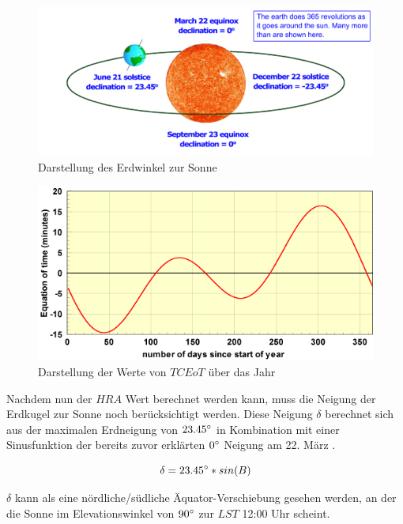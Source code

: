 \begin{figure}[htpb] %
    \centering
    \includegraphics[width=\textwidth,keepaspectratio=true]{pics/DeclinationAngleEarthSun.png}
    \caption{Darstellung des Erdwinkel zur Sonne \autocite{front:DeclinationAngle}}
    \label{fig:DeclinationAngleFigure}
\end{figure}

\begin{figure}[htpb] %
    \centering
    \includegraphics[width=\textwidth,keepaspectratio=true]{pics/TCEoT.png}
    \caption{Darstellung der Werte von $TCEoT$ über das Jahr \autocite{front:SolarTime}}
    \label{fig:TCEoT}
\end{figure}

Nachdem nun der $HRA$ Wert berechnet werden kann, muss die Neigung der Erdkugel zur Sonne noch berücksichtigt werden. Diese Neigung $\delta$ berechnet sich aus der maximalen Erdneigung von $23.45\degree$ in Kombination mit einer Sinusfunktion der bereits zuvor erklärten $0\degree$ Neigung am 22. März \autocite{front:DeclinationAngle}.

\[ \delta = 23.45\degree * sin(B) \]

$\delta$ kann als eine nördliche/südliche Äquator-Verschiebung gesehen werden, an der die Sonne im Elevationswinkel von $90\degree$ zur $LST$ 12:00 Uhr scheint.

